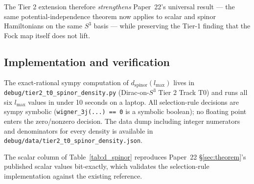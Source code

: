 The Tier 2 extension therefore \emph{strengthens} Paper~22's universal
result --- the same potential-independence theorem now applies to
scalar and spinor Hamiltonians on the same $S^3$ basis --- while
preserving the Tier-1 finding that the Fock map itself does not lift.

\subsection{Implementation and verification}

The exact-rational sympy computation of $d_{\mathrm{spinor}}(l_{\max})$
lives in \texttt{debug/tier2\_t0\_spinor\_density.py} (Dirac-on-$S^3$
Tier 2 Track T0) and runs all six $l_{\max}$ values in under 10
seconds on a laptop. All selection-rule decisions are sympy symbolic
(\texttt{wigner\_3j(...) == 0} is a symbolic boolean); no floating
point enters the zero/nonzero decision. The data dump including
integer numerators and denominators for every density is available
in \texttt{debug/data/tier2\_t0\_spinor\_density.json}.

The scalar column of Table~\ref{tab:d_spinor} reproduces Paper~22
\S\ref{sec:theorem}'s published scalar values bit-exactly, which
validates the selection-rule implementation against the existing
reference.
